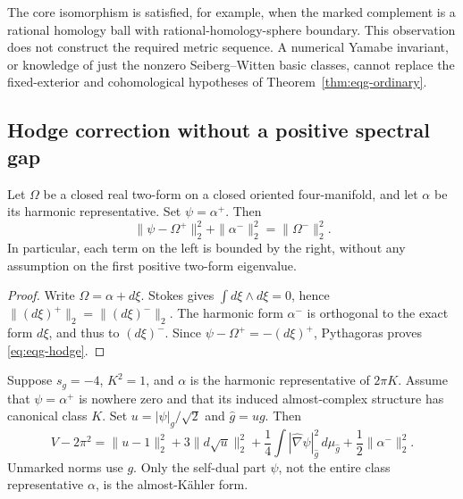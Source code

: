 The core isomorphism is satisfied, for example, when the marked
complement is a rational homology ball with rational-homology-sphere
boundary.  This observation does not construct the required metric
sequence.  A numerical Yamabe invariant, or knowledge of just the
nonzero Seiberg--Witten basic classes, cannot replace the fixed-exterior
and cohomological hypotheses of Theorem~\ref{thm:eqg-ordinary}.

\subsection{Hodge correction without a positive spectral gap}

\begin{lemma}
\label{lem:eqg-hodge}
Let $\Omega$ be a closed real two-form on a closed oriented
four-manifold, and let $\alpha$ be its harmonic representative.
Set $\psi=\alpha^+$.  Then
\begin{equation}\label{eq:eqg-hodge}
 \|\psi-\Omega^+\|_2^2+\|\alpha^-\|_2^2
 =\|\Omega^-\|_2^2.
\end{equation}
In particular, each term on the left is bounded by the right, without
any assumption on the first positive two-form eigenvalue.
\end{lemma}

\begin{proof}
Write $\Omega=\alpha+d\xi$.  Stokes gives
$\int d\xi\wedge d\xi=0$, hence
$\|(d\xi)^+\|_2=\|(d\xi)^-\|_2$.
The harmonic form $\alpha^-$ is orthogonal to the exact form $d\xi$,
and thus to $(d\xi)^-$.  Since
$\psi-\Omega^+=-(d\xi)^+$, Pythagoras proves
\eqref{eq:eqg-hodge}.
\end{proof}

\begin{proposition}
\label{prop:eqg-four-term}
Suppose $s_g=-4$, $K^2=1$, and $\alpha$ is the harmonic representative
of $2\pi K$.  Assume that $\psi=\alpha^+$ is nowhere zero and that
its induced almost-complex structure has canonical class $K$.
Set $u=|\psi|_g/\sqrt2$ and $\widehat g=ug$.  Then
\begin{equation}\label{eq:eqg-four-term}
 V-2\pi^2
 =\|u-1\|_2^2+3\|d\sqrt u\|_2^2
 +\frac14\int|\widehat\nabla\psi|_{\widehat g}^2
                      \,d\mu_{\widehat g}
 +\frac12\|\alpha^-\|_2^2.
\end{equation}
Unmarked norms use $g$.  Only the self-dual part $\psi$, not the
entire class representative $\alpha$, is the almost-Kähler form.
\end{proposition}

